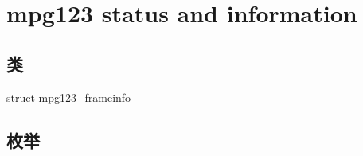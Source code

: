 \hypertarget{group__mpg123__status}{}\section{mpg123 status and information}
\label{group__mpg123__status}
\subsection*{类}
\begin{DoxyCompactItemize}
\item 
struct \hyperlink{structmpg123__frameinfo}{mpg123\+\_\+frameinfo}
\end{DoxyCompactItemize}
\subsection*{枚举}
